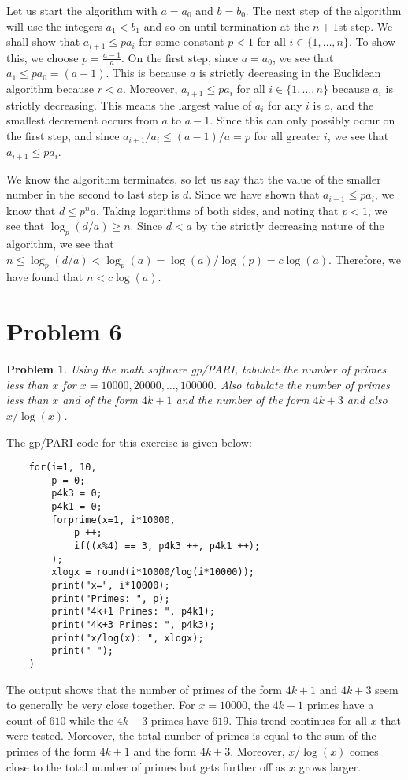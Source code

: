 \documentclass[psamsfonts]{amsart}
\newtheorem{prob}{Problem}[section]
\newenvironment{sol}{{\bfseries Solution}}{\qedsymbol}
\theoremstyle{definition}
\theoremstyle{remark}
\numberwithin{equation}{section}
\begin{document}
\begin{sol}
Let us start the algorithm with $a = a_0$ and $b = b_0$. The next step of the algorithm will use the integers $a_1 < b_1$ and so on until termination at the $n+1$st step. We shall show that $a_{i+1} \leq p a_i$ for some constant $p < 1$ for all $i \in \{1, \ldots, n \}$. To show this, we choose $p = \frac{a - 1}{a}$. On the first step, since $a = a_0$, we see that $a_1 \leq p a_0 = (a-1)$. This is because $a$ is strictly decreasing in the Euclidean algorithm because $r < a$. Moreover, $a_{i+1} \leq p a_i$ for all $i \in \{1, \ldots, n \}$ because $a_i$ is strictly decreasing. This means the largest value of $a_i$ for any $i$ is $a$, and the smallest decrement occurs from $a$ to $a - 1$. Since this can only possibly occur on the first step, and since $a_{i+1} / a_i \leq (a-1)/a = p$ for all greater $i$, we see that $a_{i+1} \leq p a_i$. 

We know the algorithm terminates, so let us say that the value of the smaller number in the second to last step is $d$. Since we have shown that $a_{i+1} \leq p a_i$, we know that $d \leq p^n a$. Taking logarithms of both sides, and noting that $p < 1$, we see that $\log_{p}(d/a) \geq n$. Since $d < a$ by the strictly decreasing nature of the algorithm, we see that $n \leq \log_p (d /a) < \log_p(a) = \log(a) / \log(p) = c \log(a)$. Therefore, we have found that $n < c \log(a)$.  
\end{sol}

\section{Problem 6}

\begin{prob}
Using the math software gp/PARI, tabulate the number of primes less than $x$ for $x = 10000, 20000, \ldots, 100000$. Also tabulate the number of primes less than $x$ and of the form $4k + 1$ and the number of the form $4k +3$ and also $x / \log(x)$. 
\end{prob}

\begin{sol}
The gp/PARI code for this exercise is given below:
\begin{verbatim}
    for(i=1, 10,
        p = 0;
        p4k3 = 0;
        p4k1 = 0;
        forprime(x=1, i*10000,
            p ++;
            if((x%4) == 3, p4k3 ++, p4k1 ++);
        );
        xlogx = round(i*10000/log(i*10000));
        print("x=", i*10000);
        print("Primes: ", p);
        print("4k+1 Primes: ", p4k1);
        print("4k+3 Primes: ", p4k3);
        print("x/log(x): ", xlogx);
        print(" ");
    )
\end{verbatim}

The output shows that the number of primes of  the form $4k+1$ and $4k+3$ seem to generally be very close together. For $x = 10000$, the $4k+1$ primes have a count of $610$ while the $4k+3$ primes have $619$. This trend continues for all $x$ that were tested. Moreover, the total number of primes is equal to the sum of the primes of the form $4k+1$ and the form $4k+3$. Moreover, $x/\log(x)$ comes close to the total number of primes but gets further off as $x$ grows larger.
\end{sol}
\end{document}
